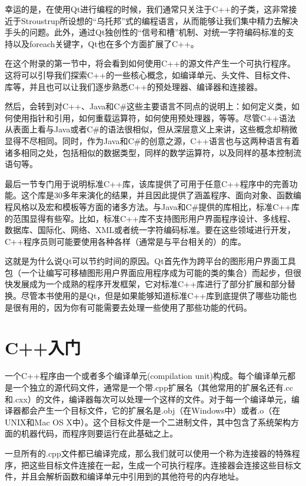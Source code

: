 \documentclass[11pt,oneside]{book}
\begin{document}
\begin{common-format}
幸运的是，在使用Qt进行编程的时候，我们通常只关注于C++的子类，这非常接近于Stroustrup所设想的“乌托邦”式的编程语言，从而能够让我们集中精力去解决手头的问题。此外，通过Qt独创性的“信号和槽”机制、对统一字符编码标准的支持以及foreach关键字，Qt也在多个方面扩展了C++。

在这个附录的第一节中，将会看到如何使用C++的源文件产生一个可执行程序。这将可以引导我们探索C++的一些核心概念，如编译单元、头文件、目标文件、库等，并且也可以让我们逐步熟悉C++的预处理器、编译器和连接器。

然后，会转到对C++、Java和C\#{}这些主要语言不同点的说明上：如何定义类，如何使用指针和引用，如何重载运算符，如何使用预处理器，等等。尽管C++语法从表面上看与Java或者C\#{}的语法很相似，但从深层意义上来讲，这些概念却稍微显得不尽相同。同时，作为Java和C\#{}的创意之源，C++语言也与这两种语言有着诸多相同之处，包括相似的数据类型，同样的数学运算符，以及同样的基本控制流语句等。

最后一节专门用于说明标准C++库，该库提供了可用于任意C++程序中的完善功能。这个库是30多年来演化的结果，并且因此提供了涵盖程序、面向对象、函数编程风格以及宏和模板等方面的诸多方法。与Java和C\#{}提供的库相比，标准C++库的范围显得有些窄。比如，标准C++库不支持图形用户界面程序设计、多线程、数据库、国际化、网络、XML或者统一字符编码标准。要在这些领域进行开发，C++程序员则可能要使用各种各样（通常是与平台相关的）的库。

这就是为什么说Qt可以节约时间的原因。Qt首先作为跨平台的图形用户界面工具包（一个让编写可移植图形用户界面应用程序成为可能的类的集合）而起步，但很快发展成为一个成熟的程序开发框架，它对标准C++库进行了部分扩展和部分替换。尽管本书使用的是Qt，但是如果能够知道标准C++库到底提供了哪些功能也是很有用的，因为你有可能需要去处理一些使用了那些功能的代码。

\section{C++入门}
一个C++程序由一个或者多个编译单元(compilation unit)构成。每个编译单元都是一个独立的源代码文件，通常是一个带.cpp扩展名（其他常用的扩展名还有.cc和.cxx）的文件，编译器每次可以处理一个这样的文件。对于每一个编译单元，编译器都会产生一个目标文件，它的扩展名是.obj（在Windows中）或者.o（在UNIX和Mac OS X中）。这个目标文件是一个二进制文件，其中包含了系统架构方面的机器代码，而程序则要运行在此基础之上。  

一旦所有的.cpp文件都已编译完成，那么我们就可以使用一个称为连接器的特殊程序，把这些目标文件连接在一起，生成一个可执行程序。连接器会连接这些目标文件，并且会解析函数和编译单元中引用到的其他符号的内存地址。


\end{common-format}
\end{document}
